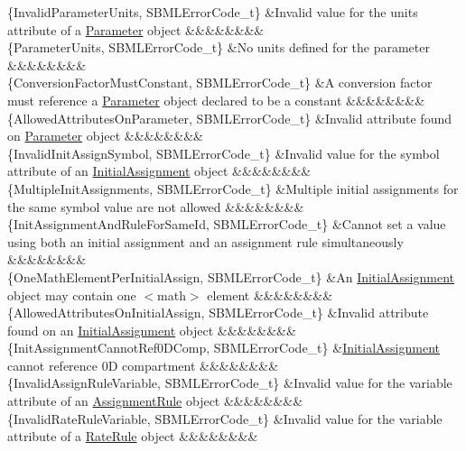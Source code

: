 \begin{DoxyParagraph}{}
\begin{longtabu}
\{Invalid\+Parameter\+Units, S\+B\+M\+L\+Error\+Code\+\_\+t\} &Invalid value for the \textquotesingle{}units\textquotesingle{} attribute of a \hyperlink{class_parameter}{Parameter} object &&&&&&&&\\
\{Parameter\+Units, S\+B\+M\+L\+Error\+Code\+\_\+t\} &No units defined for the parameter &&&&&&&&\\
\{Conversion\+Factor\+Must\+Constant, S\+B\+M\+L\+Error\+Code\+\_\+t\} &A conversion factor must reference a \hyperlink{class_parameter}{Parameter} object declared to be a constant &&&&&&&&\\
\{Allowed\+Attributes\+On\+Parameter, S\+B\+M\+L\+Error\+Code\+\_\+t\} &Invalid attribute found on \hyperlink{class_parameter}{Parameter} object &&&&&&&&\\
\{Invalid\+Init\+Assign\+Symbol, S\+B\+M\+L\+Error\+Code\+\_\+t\} &Invalid value for the \textquotesingle{}symbol\textquotesingle{} attribute of an \hyperlink{class_initial_assignment}{Initial\+Assignment} object &&&&&&&&\\
\{Multiple\+Init\+Assignments, S\+B\+M\+L\+Error\+Code\+\_\+t\} &Multiple initial assignments for the same \textquotesingle{}symbol\textquotesingle{} value are not allowed &&&&&&&&\\
\{Init\+Assignment\+And\+Rule\+For\+Same\+Id, S\+B\+M\+L\+Error\+Code\+\_\+t\} &Cannot set a value using both an initial assignment and an assignment rule simultaneously &&&&&&&&\\
\{One\+Math\+Element\+Per\+Initial\+Assign, S\+B\+M\+L\+Error\+Code\+\_\+t\} &An \hyperlink{class_initial_assignment}{Initial\+Assignment} object may contain one {\ttfamily $<$math$>$} element &&&&&&&&\\
\{Allowed\+Attributes\+On\+Initial\+Assign, S\+B\+M\+L\+Error\+Code\+\_\+t\} &Invalid attribute found on an \hyperlink{class_initial_assignment}{Initial\+Assignment} object &&&&&&&&\\
\{Init\+Assignment\+Cannot\+Ref0\+D\+Comp, S\+B\+M\+L\+Error\+Code\+\_\+t\} &\hyperlink{class_initial_assignment}{Initial\+Assignment} cannot reference 0D compartment &&&&&&&&\\
\{Invalid\+Assign\+Rule\+Variable, S\+B\+M\+L\+Error\+Code\+\_\+t\} &Invalid value for the \textquotesingle{}variable\textquotesingle{} attribute of an \hyperlink{class_assignment_rule}{Assignment\+Rule} object &&&&&&&&\\
\{Invalid\+Rate\+Rule\+Variable, S\+B\+M\+L\+Error\+Code\+\_\+t\} &Invalid value for the \textquotesingle{}variable\textquotesingle{} attribute of a \hyperlink{class_rate_rule}{Rate\+Rule} object &&&&&&&&\\

\end{longtabu}
\end{DoxyParagraph}
